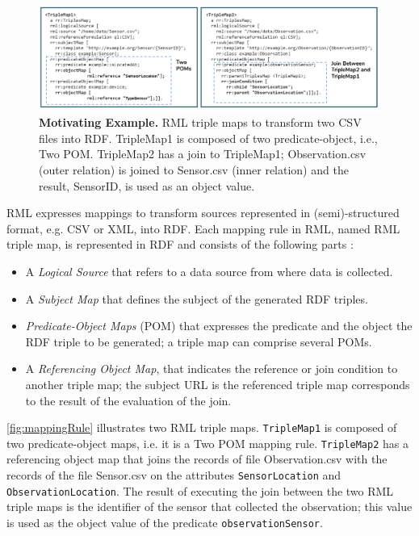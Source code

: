 \begin{figure}[t!]
	\centering
	\includegraphics[width=\columnwidth]{figures/TripleMap.jpg}
	\caption{{\bf Motivating Example.} RML triple maps to transform two CSV files into RDF. TripleMap1 is composed of two predicate-object, i.e., Two POM. TripleMap2 has a join to TripleMap1; Observation.csv (outer relation) is joined to  Sensor.csv (inner relation) and the result, SensorID, is used as an object value.}
	\label{fig:mappingRule}
\end{figure}

RML expresses mappings to transform sources represented in (semi)-structured format, e.g. CSV or XML, into RDF. Each mapping rule in RML, named RML triple map, is represented in RDF and consists of the following parts \citep{dimou2014rml}:
\begin{itemize}
    \item A \emph{Logical Source} that refers to a data source from where data is collected.
    \item A \emph{Subject Map} that defines the subject of the generated RDF triples. 
    \item \emph{Predicate-Object Maps} (POM) that expresses the predicate and the object the RDF triple to be generated; a triple map can comprise several POMs.
\item
A \emph{Referencing Object Map}, that indicates the reference or join condition to another triple map; the subject URL is the referenced triple map corresponds to the result of the evaluation of the join. 
\end{itemize}
\autoref{fig:mappingRule} illustrates two RML triple maps. \texttt{TripleMap1} is composed of two predicate-object maps, i.e. it is a Two POM mapping rule. \texttt{TripleMap2} has a referencing object map that joins the records of file Observation.csv with the records of the file Sensor.csv on the attributes \texttt{SensorLocation} and \texttt{ObservationLocation}. The result of executing the join between the two RML triple maps is the identifier of the sensor that collected the observation; this value is used as the object value of the predicate \texttt{observationSensor}.
